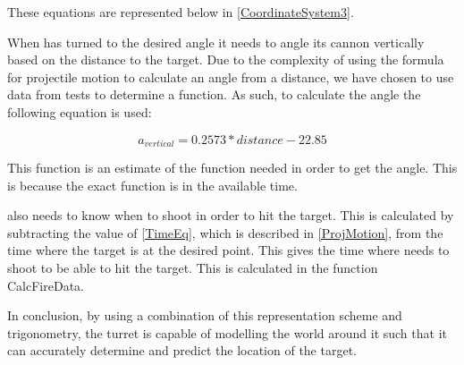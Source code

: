 These equations are represented below in \autoref{CoordinateSystem3}.


When \name has turned to the desired angle it needs to angle its cannon
vertically based on the distance to the target. Due to the complexity of using
the formula for projectile motion to calculate an angle from a distance, we have
chosen to use data from tests to determine a function. As such, to calculate the
angle the following equation is used:

\begin{equation}\label{locEq4}
a_{vertical}=0.2573*distance-22.85
\end{equation} 

 This function is an estimate of the
function needed in order to get the angle. This is because the exact function
is  in the available time.\nl

\name also needs to know when to shoot in order to hit the target.
This is calculated by subtracting the value of \autoref{TimeEq}, which is described in
\autoref{ProjMotion}, from the time where the target is at the desired point.
This gives the time where \name needs to shoot to be able to hit the target.
This is calculated in the function CalcFireData.

In conclusion, by using a combination of this representation scheme and
trigonometry, the turret is capable of modelling the world around it such that
it can accurately determine and predict the location of the target.